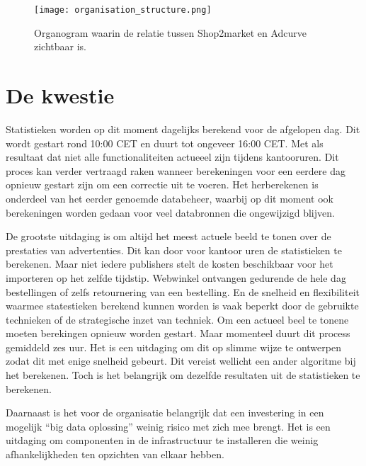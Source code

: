\begin{figure}[h]
    \texttt{[image: organisation\_structure.png]}
    \caption{Organogram waarin de relatie tussen Shop2market en Adcurve zichtbaar is.}
    \label{fig:orgchart}
\end{figure}

\section{De kwestie} %

Statistieken worden op dit moment dagelijks berekend voor de afgelopen dag. Dit wordt gestart rond 10:00 CET en duurt tot ongeveer 16:00 CET. Met als resultaat dat niet alle functionaliteiten actueeel zijn tijdens kantooruren.
Dit proces kan verder vertraagd raken wanneer berekeningen voor een eerdere dag opnieuw gestart zijn om een correctie uit te voeren. Het herberekenen is onderdeel van het eerder genoemde databeheer, waarbij op dit moment ook berekeningen worden gedaan voor veel databronnen die ongewijzigd blijven.

De grootste uitdaging is om altijd het meest actuele beeld te tonen over de prestaties van advertenties. Dit kan door voor kantoor uren de statistieken te berekenen. Maar niet iedere publishers stelt de kosten beschikbaar voor het importeren op het zelfde tijdstip. Webwinkel ontvangen gedurende de hele dag bestellingen of zelfs retournering van een bestelling. En de snelheid en flexibiliteit waarmee statestieken berekend kunnen worden is vaak beperkt door de gebruikte technieken of de strategische inzet van techniek. Om een actueel beel te tonene moeten berekingen opnieuw worden gestart. Maar momenteel duurt dit process gemiddeld zes uur. Het is een uitdaging om dit op slimme wijze te ontwerpen zodat dit met enige snelheid gebeurt. Dit vereist wellicht een ander algoritme bij het berekenen. Toch is het belangrijk om dezelfde resultaten uit de statistieken te berekenen.

Daarnaast is het voor de organisatie belangrijk dat een investering in een mogelijk “big data oplossing” weinig risico met zich mee brengt. Het is een uitdaging om componenten in de infrastructuur te installeren die weinig afhankelijkheden ten opzichten van elkaar hebben.



